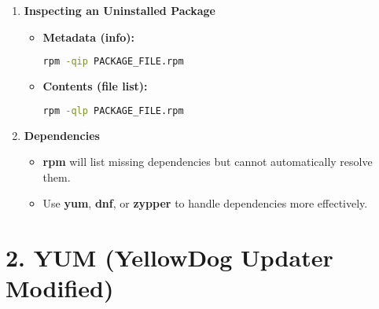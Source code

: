\documentclass[a4paper]{report}
\begin{document}
\begin{enumerate}
\item \textbf{Inspecting an Uninstalled Package}
\begin{itemize}
    \item \textbf{Metadata (info):}
    \begin{lstlisting}[language=bash]
rpm -qip PACKAGE_FILE.rpm
    \end{lstlisting}
    \item \textbf{Contents (file list):}
    \begin{lstlisting}[language=bash]
rpm -qlp PACKAGE_FILE.rpm
    \end{lstlisting}
\end{itemize}

\item \textbf{Dependencies}
\begin{itemize}
    \item \textbf{rpm} will list missing dependencies but cannot automatically resolve them.
    \item Use \textbf{yum}, \textbf{dnf}, or \textbf{zypper} to handle dependencies more effectively.
\end{itemize}
\end{enumerate}

\section*{2. YUM (YellowDog Updater Modified)}
\end{document}
